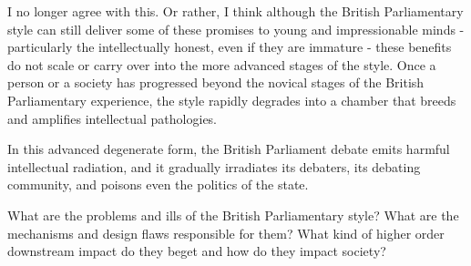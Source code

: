 I no longer agree with this. Or rather, I think although the British Parliamentary style can still deliver some of these promises to young and impressionable minds - particularly the intellectually honest, even if they are immature - these benefits do not scale or carry over into the more advanced stages of the style. Once a person or a society has progressed beyond the novical stages of the British Parliamentary experience, the style rapidly degrades into a chamber that breeds and amplifies intellectual pathologies.

In this advanced degenerate form, the British Parliament debate emits harmful intellectual radiation, and it gradually irradiates its debaters, its debating community, and poisons even the politics of the state. 

What are the problems and ills of the British Parliamentary style? What are the mechanisms and design flaws responsible for them? What kind of higher order downstream impact do they beget and how do they impact society?

